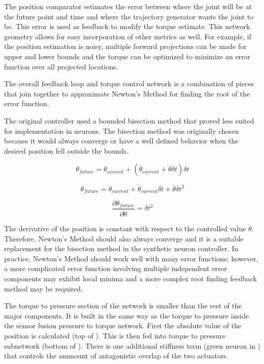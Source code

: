 The position comparator estimates the error between where the joint will be at
the future point and time and where the trajectory generator wants the joint
to be. This error is used as feedback to modify the torque estimate.
This network geometry allows for easy incorporation of other metrics as well.
For example, if the position estimation is noisy, multiple forward projections
can be made for upper and lower bounds and the torque can be optimized to 
minimize an error function over all projected locations.


The overall feedback loop and torque control network is a combination of pieces
that join together to approximate
Newton's Method for finding the root of the error function.

The original 
controller used a bounded bisection method that proved less suited for 
implementation in neurons. The bisection method was originally chosen because
it would always converge or have a well defined behavior when the desired
position fell outside the bounds.

\begin{equation}
\theta_{future} = \theta_{current} + (\dot{\theta}_{current} + \ddot{\theta} \delta t) \delta t
\end{equation}

\begin{equation}
\theta_{future} = \theta_{current} + \dot{\theta}_{current} \delta t + \ddot{\theta} \delta t^{2}
\end{equation}

\begin{equation}
\dfrac{\partial \theta_{future}}{\partial \ddot{\theta}} = \delta t^{2}
\end{equation}

The derivative of the position is constant with respect to the controlled value
$\ddot{\theta}$. Therefore, Newton's Method should also always converge and it is a suitable replacement for the bisection method in the synthetic neuron
controller. In practice, Newton's Method should work well with many error functions; however,
a more complicated error function involving multiple independent error 
components may exhibit local minima and a more complex root finding feedback
method may be required.


The torque to pressure section of the network is smaller than the rest of the 
major components. It is built in the same way as the torque to pressure inside
the sensor fusion pressure to torque network. First the absolute value of the position is calculated (top of ). This is then fed into torque to pressure subnetwork (bottom of ). There is one additional stiffness term (green neuron in ) that controls the ammount of antagonistic overlap of the two actuators.

